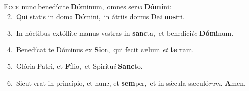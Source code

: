 \lettrine{\initial\textcolor{\initialcolor}{E}}{cce} nunc benedícite \textbf{Dó}\-minum,~\star omnes ser\textit{vi} \textbf{Dó}\-\textbf{mi}ni:\\
{\numbfont\textcolor{\numbcolor}{~2.}}~Qui statis in domo \textbf{Dó}\-mini,~\star in átriis domus De\textit{i} \textbf{nos}\-tri.\par
{\numbfont\textcolor{\numbcolor}{~3.}}~In nóctibus extóllite manus vestras in \textbf{sanc}\-ta,~\star et benedíci\textit{te} \textbf{Dó}\-\textbf{mi}num.\par
{\numbfont\textcolor{\numbcolor}{~4.}}~Benedícat te Dóminus ex \textbf{Si}\-on,~\star qui fecit cælum \textit{et} \textbf{ter}\-ram.\par
{\numbfont\textcolor{\numbcolor}{~5.}}~Glória Patri, et \textbf{Fí}\-lio,~\star et Spirítu\textit{i} \textbf{Sanc}\-to.\par
{\numbfont\textcolor{\numbcolor}{~6.}}~Sicut erat in princípio, et nunc, et \textbf{sem}\-per,~\star et in sǽcula sæculó\-\textit{rum}\-. \textbf{A}\-men.\par
